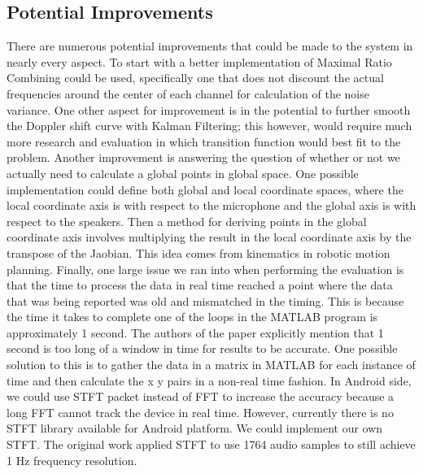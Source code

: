 \documentclass{acm_proc_article-sp}
\begin{document}
\subsection{Potential Improvements}
There are numerous potential improvements that could be made to the system in nearly every aspect. To start with a better implementation of Maximal Ratio Combining could be used, specifically one that does not discount the actual frequencies around the center of each channel for calculation of the noise variance. One other aspect for improvement is in the potential to further smooth the Doppler shift curve with Kalman Filtering; this however, would require much more research and evaluation in which transition function would best fit to the problem. Another improvement is answering the question of whether or not we actually need to calculate a global points in global space. One possible implementation could define both global and local coordinate spaces, where the local coordinate axis is with respect to the microphone and the global axis is with respect to the speakers. Then a method for deriving points in the global coordinate axis involves multiplying the result in the local coordinate axis by the transpose of the Jaobian. This idea comes from kinematics in robotic motion planning. Finally, one large issue we ran into when performing the evaluation is that the time to process the data in real time reached a point where the data that was being reported was old and mismatched in the timing. This is because the time it takes to complete one of the loops in the MATLAB program is approximately 1 second. The authors of the paper explicitly mention that 1 second is too long of a window in time for results to be accurate. One possible solution to this is to gather the data in a matrix in MATLAB for each instance of time and then calculate the x y pairs in a non-real time fashion. 
In Android side, we could use STFT packet instead of FFT to increase the accuracy
because a long FFT cannot track the device in real time. However, currently there is 
no STFT library available for Android platform. We could implement our own STFT. 
The original work applied STFT to use 1764 audio samples to still achieve 1 Hz frequency
resolution.

%

%
%
\end{document}
